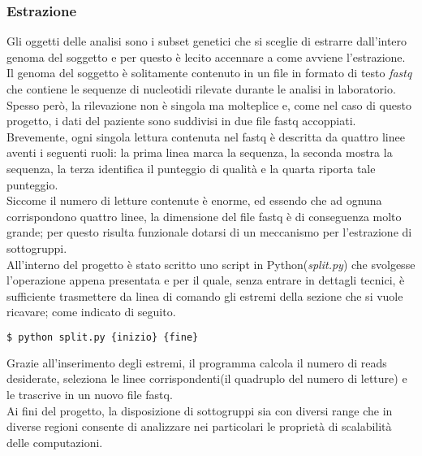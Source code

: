 \subsubsection{Estrazione}
Gli oggetti delle analisi sono i subset genetici che si sceglie di estrarre dall'intero genoma del soggetto e per questo è lecito accennare a come avviene l'estrazione.\\
Il genoma del soggetto è solitamente contenuto in un file in formato di testo \textit{fastq} che contiene le sequenze di nucleotidi rilevate durante le analisi in laboratorio. Spesso però, la rilevazione non è singola ma molteplice e, come nel caso di questo progetto, i dati del paziente sono suddivisi in due file fastq accoppiati. \\
Brevemente, ogni singola lettura contenuta nel fastq è descritta da quattro linee aventi i seguenti ruoli: la prima linea marca la sequenza, la seconda mostra la sequenza, la terza identifica il punteggio di qualità e la quarta riporta tale punteggio.\\ 
Siccome il numero di letture contenute è enorme, ed essendo che ad ognuna corrispondono quattro linee, la dimensione del file fastq è di conseguenza molto grande; per questo risulta funzionale dotarsi di un meccanismo per l'estrazione di sottogruppi.\\
All'interno del progetto è stato scritto uno script in Python(\textit{split.py}) che svolgesse l'operazione appena presentata e per il quale, senza entrare in dettagli tecnici, è sufficiente trasmettere da linea di comando gli estremi della sezione che si vuole ricavare; come indicato di seguito.
\begin{lstlisting}[language=Python]
$ python split.py {inizio} {fine}
\end{lstlisting} 
Grazie all'inserimento degli estremi, il programma calcola il numero di reads desiderate, seleziona le linee corrispondenti(il quadruplo del numero di letture) e le trascrive in un nuovo file fastq.\\
Ai fini del progetto, la disposizione di sottogruppi sia con diversi range che in diverse regioni consente di analizzare nei particolari le proprietà di scalabilità delle computazioni.    

